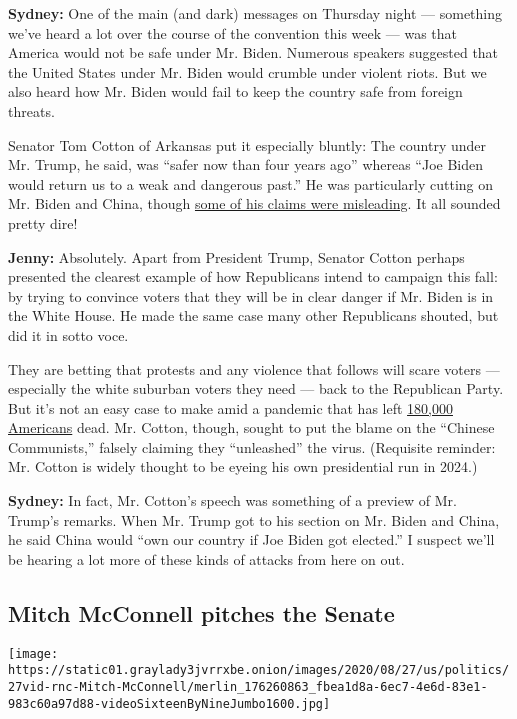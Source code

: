 \textbf{Sydney:} One of the main (and dark) messages on Thursday night
--- something we've heard a lot over the course of the convention this
week --- was that America would not be safe under Mr. Biden. Numerous
speakers suggested that the United States under Mr. Biden would crumble
under violent riots. But we also heard how Mr. Biden would fail to keep
the country safe from foreign threats.

Senator Tom Cotton of Arkansas put it especially bluntly: The country
under Mr. Trump, he said, was ``safer now than four years ago'' whereas
``Joe Biden would return us to a weak and dangerous past.'' He was
particularly cutting on Mr. Biden and China, though
\href{https://www.nytimes3xbfgragh.onion/live/2020/08/27/us/rnc-fact-check}{some
of his claims were misleading}. It all sounded pretty dire!

\textbf{Jenny:} Absolutely. Apart from President Trump, Senator Cotton
perhaps presented the clearest example of how Republicans intend to
campaign this fall: by trying to convince voters that they will be in
clear danger if Mr. Biden is in the White House. He made the same case
many other Republicans shouted, but did it in sotto voce.

They are betting that protests and any violence that follows will scare
voters --- especially the white suburban voters they need --- back to
the Republican Party. But it's not an easy case to make amid a pandemic
that has left
\href{https://www.nytimes3xbfgragh.onion/interactive/2020/us/coronavirus-us-cases.html}{180,000
Americans} dead. Mr. Cotton, though, sought to put the blame on the
``Chinese Communists,'' falsely claiming they ``unleashed'' the virus.
(Requisite reminder: Mr. Cotton is widely thought to be eyeing his own
presidential run in 2024.)

\textbf{Sydney:} In fact, Mr. Cotton's speech was something of a preview
of Mr. Trump's remarks. When Mr. Trump got to his section on Mr. Biden
and China, he said China would ``own our country if Joe Biden got
elected.'' I suspect we'll be hearing a lot more of these kinds of
attacks from here on out.

\hypertarget{mitch-mcconnell-pitches-the-senate}{%
\subsection{Mitch McConnell pitches the
Senate}\label{mitch-mcconnell-pitches-the-senate}}

\texttt{[image: https://static01.graylady3jvrrxbe.onion/images/2020/08/27/us/politics/27vid-rnc-Mitch-McConnell/merlin\_176260863\_fbea1d8a-6ec7-4e6d-83e1-983c60a97d88-videoSixteenByNineJumbo1600.jpg]}

